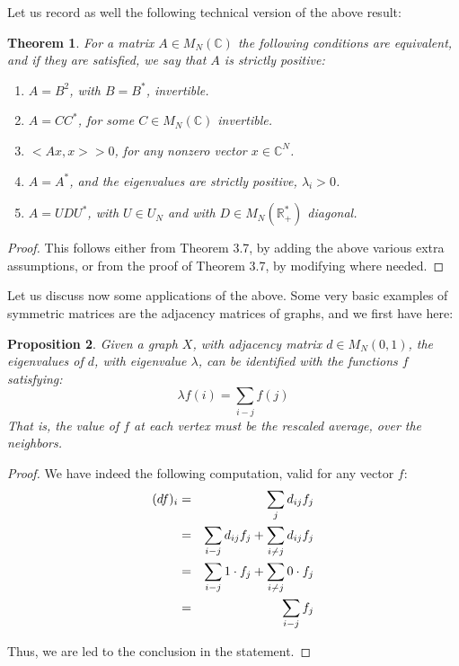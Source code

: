\documentclass[12pt]{amsbook}
\newtheorem{theorem}{Theorem}[chapter]
\newtheorem{proposition}[theorem]{Proposition}
\begin{document}
Let us record as well the following technical version of the above result:


\begin{theorem}
For a matrix $A\in M_N(\mathbb C)$ the following conditions are equivalent, and if they are satisfied, we say that $A$ is strictly positive:
\begin{enumerate}
\item $A=B^2$, with $B=B^*$, invertible.

\item $A=CC^*$, for some $C\in M_N(\mathbb C)$ invertible.

\item $<Ax,x>>0$, for any nonzero vector $x\in\mathbb C^N$.

\item $A=A^*$, and the eigenvalues are strictly positive, $\lambda_i>0$.

\item $A=UDU^*$, with $U\in U_N$ and with $D\in M_N(\mathbb R_+^*)$ diagonal.
\end{enumerate}
\end{theorem}

\begin{proof}
This follows either from Theorem 3.7, by adding the above various extra assumptions, or from the proof of Theorem 3.7, by modifying where needed.
\end{proof}

Let us discuss now some applications of the above. Some very basic examples of symmetric matrices are the adjacency matrices of graphs, and we first have here:


\begin{proposition}
Given a graph $X$, with adjacency matrix $d\in M_N(0,1)$, the eigenvalues of $d$, with eigenvalue $\lambda$, can be identified with the functions $f$ satisfying:
$$\lambda f(i)=\sum_{i-j}f(j)$$ 
That is, the value of $f$ at each vertex must be the rescaled average, over the neighbors. 
\end{proposition}

\begin{proof}
We have indeed the following computation, valid for any vector $f$:
\begin{eqnarray*}
(df)_i
&=&\sum_jd_{ij}f_j\\
&=&\sum_{i-j}d_{ij}f_j+\sum_{i\not-j}d_{ij}f_j\\
&=&\sum_{i-j}1\cdot f_j+\sum_{i\not-j}0\cdot f_j\\
&=&\sum_{i-j}f_j
\end{eqnarray*}

Thus, we are led to the conclusion in the statement.
\end{proof}
\end{document}
